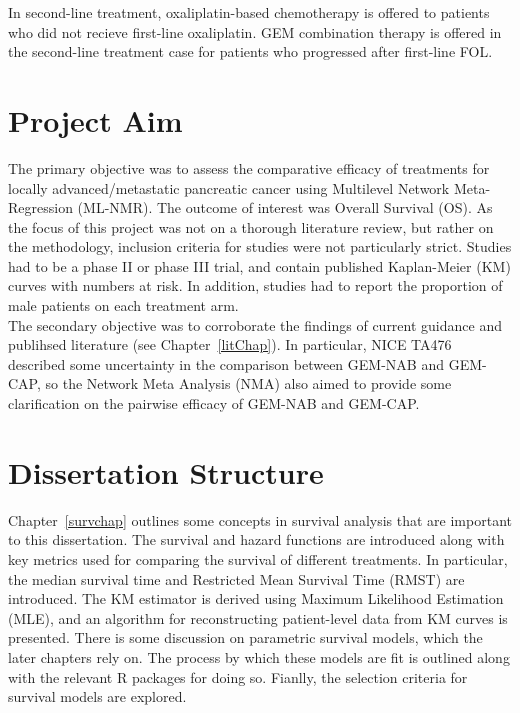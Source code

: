 In second-line treatment, oxaliplatin-based chemotherapy is offered to patients who did not recieve first-line oxaliplatin. GEM combination therapy is offered in the second-line treatment case for patients who progressed after first-line FOL.

\section{Project Aim}\label{sec:aims}
The primary objective was to assess the comparative efficacy of treatments for locally advanced/metastatic pancreatic cancer using Multilevel Network Meta-Regression (ML-NMR). The outcome of interest was Overall Survival (OS). As the focus of this project was not on a thorough literature review, but rather on the methodology, inclusion criteria for studies were not particularly strict. Studies had to be a phase II or phase III trial, and contain published Kaplan-Meier (KM) curves with numbers at risk. In addition, studies had to report the proportion of male patients on each treatment arm. \\

The secondary objective was to corroborate the findings of current guidance and publihsed literature (see Chapter~\ref{litChap}). In particular, NICE TA476~\cite{TA476} described some uncertainty in the comparison between GEM-NAB and GEM-CAP, so the Network Meta Analysis (NMA) also aimed to provide some clarification on the pairwise efficacy of GEM-NAB and GEM-CAP.  

\section{Dissertation Structure}
Chapter~\ref{survchap} outlines some concepts in survival analysis that are important to this dissertation. The survival and hazard functions are introduced along with key metrics used for comparing the survival of different treatments. In particular, the median survival time and Restricted Mean Survival Time (RMST) are introduced. The KM estimator is derived using Maximum Likelihood Estimation (MLE), and an algorithm for reconstructing patient-level data from KM curves is presented. There is some discussion on parametric survival models, which the later chapters rely on. The process by which these models are fit is outlined along with the relevant R packages for doing so. Fianlly, the selection criteria for survival models are explored.\\

